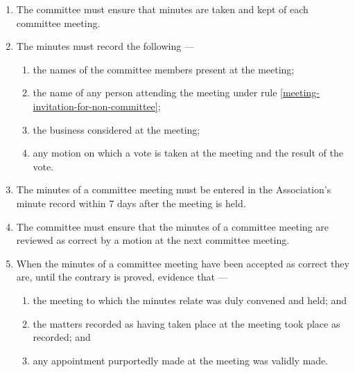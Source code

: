 \documentclass[../constitution.tex]{subfiles}
\begin{document}
\begin{enumerate}

\item The committee must ensure that minutes are taken and kept of each committee meeting.
\item The minutes must record the following ---

  \begin{enumerate}
  
  \item the names of the committee members present at the meeting;
  \item the name of any person attending the meeting under rule \ref{meeting-invitation-for-non-committee};
  \item the business considered at the meeting;
  \item any motion on which a vote is taken at the meeting and the result of the vote.
  \end{enumerate}
\item The minutes of a committee meeting must be entered in the Association's minute record within 7 days after the meeting is held. 
\item The committee must ensure that the minutes of a committee meeting are reviewed as correct by a motion at the next committee meeting.  
\item When the minutes of a committee meeting have been accepted as correct they are, until the contrary is proved, evidence that ---

  \begin{enumerate}
  
  \item the meeting to which the minutes relate was duly convened and held; and
  \item the matters recorded as having taken place at the meeting took place as recorded; and
  \item any appointment purportedly made at the meeting was validly made.
  \end{enumerate}
\end{enumerate}
\end{document}
